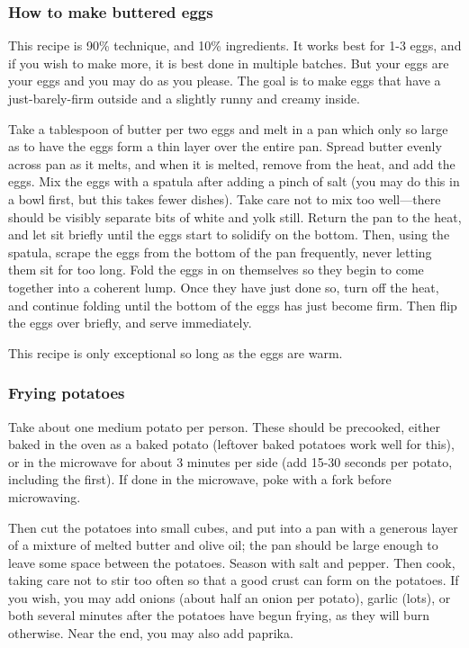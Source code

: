\documentclass[10pt]{article}
\begin{document}
\subsubsection*{How to make buttered eggs}

This recipe is 90\% technique, and 10\% ingredients.
It works best for 1-3 eggs, and if you wish to make more, it is best done in multiple batches.
But your eggs are your eggs and you may do as you please.
The goal is to make eggs that have a just-barely-firm outside and a slightly runny and creamy inside.

Take a tablespoon of butter per two eggs and melt in a pan which only so large as to have the eggs form a thin layer over the entire pan.
Spread butter evenly across pan as it melts, and when it is melted, remove from the heat, and add the eggs.
Mix the eggs with a spatula after adding a pinch of salt (you may do this in a bowl first, but this takes fewer dishes).
Take care not to mix too well---there should be visibly separate bits of white and yolk still.
Return the pan to the heat, and let sit briefly until the eggs start to solidify on the bottom.
Then, using the spatula, scrape the eggs from the bottom of the pan frequently, never letting them sit for too long.
Fold the eggs in on themselves so they begin to come together into a coherent lump.
Once they have just done so, turn off the heat, and continue folding until the bottom of the eggs has just become firm.
Then flip the eggs over briefly, and serve immediately.

This recipe is only exceptional so long as the eggs are warm.

\subsubsection*{Frying potatoes}

Take about one medium potato per person.
These should be precooked, either baked in the oven as a baked potato (leftover baked potatoes work well for this), or in the microwave for about 3 minutes per side (add 15-30 seconds per potato, including the first).
If done in the microwave, poke with a fork before microwaving.

Then cut the potatoes into small cubes, and put into a pan with a generous layer of a mixture of melted butter and olive oil; the pan should be large enough to leave some space between the potatoes.
Season with salt and pepper.
Then cook, taking care not to stir too often so that a good crust can form on the potatoes.
If you wish, you may add onions (about half an onion per potato), garlic (lots), or both several minutes after the potatoes have begun frying, as they will burn otherwise.
Near the end, you may also add paprika.
\end{document}
